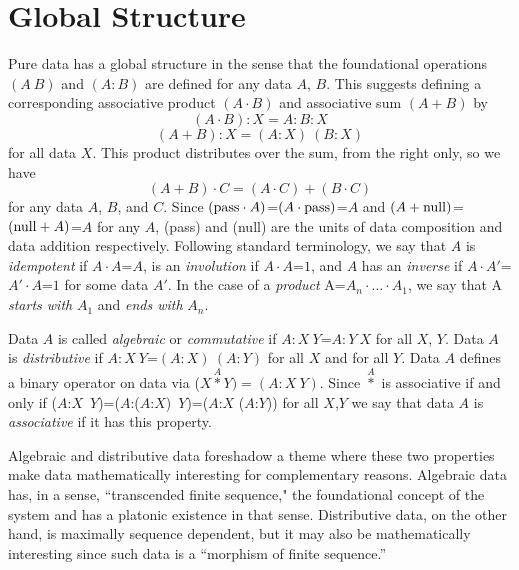 \documentclass[11pt]{article}
\begin{document}
\section{Global Structure} 

    Pure data has a global structure in the sense that the foundational operations $(A\ B)$ and $(A:B)$ are defined for any data $A$, $B$.  
This suggests defining a corresponding associative product $(A\cdot B)$ and associative sum $(A+B)$ by    
\begin{equation}
(A \cdot B):X = A:B:X 
\end{equation}
\begin{equation}
(A+B):X = (A:X)\ (B:X) 
\end{equation}
for all data $X$. This product distributes over the sum, from the right only, so we have 
\begin{equation}
(A+B)\cdot C=(A\cdot C)+(B\cdot C) 
\end{equation}
for any data $A$, $B$, and $C$.
Since $({\rm pass}\cdot A)$=$(A\cdot {\rm pass})$=$A$ and $(A+{\rm null})$=$({\rm null}+A)$=$A$ for any $A$, (pass) and (null) are the units of data composition and 
data addition respectively.  
Following standard terminology, we say that $A$ is {\it idempotent} if $A\cdot A$=$A$, is an {\it involution} if $A\cdot A$=$1$, and $A$ has an {\it inverse} if $A\cdot A'$=$A'\cdot A$=$1$ for some data $A'$.   
In the case of a {\it product}  A=$A_n\cdot\dots\cdot A_1$, we say that A {\it starts with} $A_1$ and {\it ends with} $A_n$.   

Data $A$ is called {\it algebraic} or {\it commutative} if $A:X\ Y$=$A:Y\ X$ for all $X$, $Y$.  Data $A$ is 
{\it distributive} if $A:X\ Y$=$(A:X)\ (A:Y)$ for all $X$ and for all $Y$.  
Data $A$ defines a binary operator on data via ($X{\overset A\ast}Y)=(A:X\ Y)$.  Since ${\overset A\ast}$ is associative if and only if 
 ($A$:$X$\ $Y$)=($A$:($A$:$X$)\ $Y$)=($A$:$X$ ($A$:$Y$)) for all $X$,$Y$ we say that data $A$ is {\it associative} if it has this property.  
 
Algebraic and distributive data foreshadow a theme where these two properties make data mathematically interesting for complementary reasons.  
Algebraic data has, in a sense, ``transcended finite sequence," the foundational concept of the system and has a platonic existence in 
that sense.  Distributive data, on the other hand, is maximally sequence dependent, but it may also be mathematically interesting since 
such data is a ``morphism of finite sequence.''   
 
\end{document}
